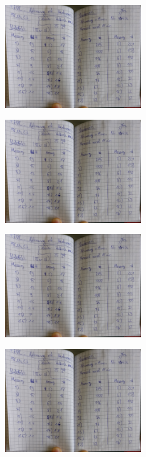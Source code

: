 \begin{minipage}[t]{0.4\textwidth}
    \includegraphics[height=4.5cm, page=1]{Abbildungen/v702-messdaten.pdf}
\end{minipage}
\begin{minipage}[t]{0.4\textwidth}
    \includegraphics[height=4.5cm, keepaspectratio, page=2]{Abbildungen/v702-messdaten.pdf}
\end{minipage}
\begin{minipage}[t]{0.4\textwidth}
    \includegraphics[height=4.5cm, page=3]{Abbildungen/v702-messdaten.pdf}
\end{minipage}
\begin{minipage}[t]{0.4\textwidth}
    \includegraphics[height=4.5cm, keepaspectratio, page=4]{Abbildungen/v702-messdaten.pdf}
\end{minipage}

